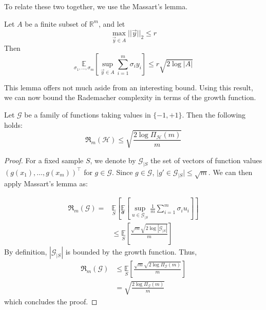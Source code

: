 To relate these two together, we use the Massart's lemma. 
\begin{lemma}
    Let $A$ be a finite subset of $\mathbb{R}^{m}$, and let $$\max_{\vec{y}\in A} \lvert\lvert \vec{y}\rvert\rvert_{2} \leq r$$
    Then 
    \begin{equation}
        \underset{\sigma_{1},\dots,\sigma_{m}}{\mathbb{E}} \left[\sup_{\vec{y}\in A} \sum^{m}_{i=1}\sigma_{i} y_{i} \right] \leq r \sqrt{2\log{\lvert A \rvert}}
    \end{equation}
\end{lemma}
This lemma offers not much aside from an interesting bound. Using this result, we can now bound the Rademacher complexity in terms of the growth function. 
\begin{col}\label{col:what}
    Let $\mathcal{G}$ be a family of functions taking values in $\{-1, + 1\}$. Then the following holds: 
    \begin{equation}
        \mathfrak{R}_{m}(\mathcal{H}) \leq \sqrt{\frac{2\log{\Pi_{\mathcal{H}}(m)}}{m}}
    \end{equation}
\end{col}
\begin{proof}
    For a fixed sample $S$, we denote by $\mathcal{G}_{|S}$ the set of vectors of function values $(g(x_1),\dots,g(x_m))^{\top}$ for $g\in \mathcal{G}$. Since $g\in \mathcal{G}$, $\lvert g'\in \mathcal{G}_{|S} \rvert \leq \sqrt{m}$. We can then apply Massart's lemma as: 

    \begin{equation}
        \begin{split}
            \mathfrak{R}_{m}(\mathcal{G}) =& \underset{S}{\mathbb{E}} \left[ \underset{\bm{\sigma}}{\mathbb{E}} \left[ \sup_{u\in \mathcal{G}_{|S}} \frac{1}{m} \sum^{m}_{i=1} \sigma_{i} u_{i} \right] \right]\\
            & \leq \underset{S}{\mathbb{E}} \left[\frac{\sqrt{m}\sqrt{2\log{|\mathcal{G}_{|S}|}}}{m}\right]
        \end{split}
    \end{equation}
    By definition, $|\mathcal{G}_{|S}|$ is bounded by the growth function. Thus, 
    \begin{equation}
        \begin{split}
            \mathfrak{R}_{m}(\mathcal{G}) &\leq \underset{S}{\mathbb{E}} \left[\frac{\sqrt{m}\sqrt{2\log{\Pi_{\mathcal{G}}(m) }}}{m}\right] \\
            & = \sqrt{\frac{2\log{\Pi_{\mathcal{G}} (m)}}{m}}
        \end{split}
    \end{equation}
    which concludes the proof. 
\end{proof}
